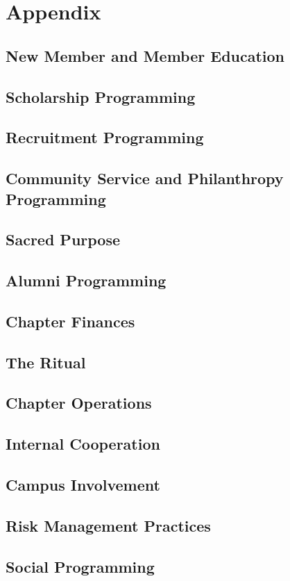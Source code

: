 \chapter{Appendix}

  \section{New Member and Member Education} 

  \section{Scholarship Programming}
    
  \section{Recruitment Programming}
    
  \section{Community Service and Philanthropy Programming}
  
  \section{Sacred Purpose}
    
  \section{Alumni Programming}
  
  \section{Chapter Finances}
  
  \section{The Ritual}
    
  \section{Chapter Operations}
  
  \section{Internal Cooperation}
  
  \section{Campus Involvement}
    
  \section{Risk Management Practices}
    
  \section{Social Programming}
    